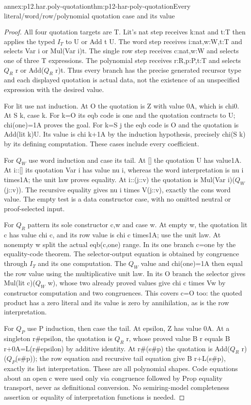 \begin{annexitem}{annex:p12.har.poly-quotation}{thm:p12-har-poly-quotation}{Every literal/word/row/polynomial quotation case and its value}
\begin{proof}
All four quotation targets are T. Lit's nat step receives k:nat and
t:T then applies the typed \(I_T\) to U or Add t U. The word step
receives i:nat,w:W,t:T and selects Var i or Mul(Var i)t. The
single row step receives c:nat,w:W and selects one of three T
expressions. The polynomial step receives r:R,p:P,t:T and selects
\(Q_R\) r or Add(\(Q_R\) r)t. Thus every branch has the precise generated
recursor type and each displayed quotation is actual data, not the
existence of an unspecified expression with the desired value.

For lit use nat induction. At O the quotation is Z with value 0A,
which is chi0. At S k, case k. For k=O its eqb code is one and
the quotation contracts to U; chi(one)=1A proves the goal. For
k=S j the eqb code is O and the quotation is Add(lit k)U. Its
value is chi k+1A by the induction hypothesis, precisely chi(S k)
by its defining computation. These cases include every coefficient.

For \(Q_W\) use word induction and case its tail. At [] the quotation
U has value1A. At i::[] its quotation Var i has value nu i, whereas
the word interpretation is nu i times1A; the unit law proves equality.
At i::(j::v) the quotation is Mul(Var i)(\(Q_W\)(j::v)). The recursive
equality gives nu i times V(j::v), exactly the cons word value.
The empty test is a data constructor case, with no omitted neutral
or proof-selected input.

For \(Q_R\) pattern its sole constructor c,w and case w. At empty w,
the quotation lit c has value chi c, and its row value is chi c
times1A; use the unit law. At nonempty w split the actual eqb(c,one)
range. In its one branch c=one by the equality-code theorem. The
selector-output equation is obtained by congruence through \(I_T\) and
its one computation. The \(Q_W\) value and chi(one)=1A then equal the
row value using the multiplicative unit law. In its O branch the
selector gives Mul(lit c)(\(Q_W\) w), whose two already proved values
give chi c times Vw by constructor computation and two congruences.
This covers c=O too: the quoted product has a zero literal and its
value is zero by annihilation, as is the row interpretation.

For \(Q_P\) use P induction, then case the tail. At epsilon, Z has value
0A. At a singleton r\#epsilon, the quotation is \(Q_R\) r, whose proved
value B r equals B r+0A=L(r\#epsilon) by additive identity. At r\#(s\#p)
the quotation is Add(\(Q_R\) r)(\(Q_P\)(s\#p)); the row equation and recursive
tail equation give B r+L(s\#p), exactly its list interpretation.
These are all polynomial shapes. Code equations about an open c were
used only via congruence followed by Prop equality transport, never
as definitional conversion. No semiring-model completeness assertion
or equality of interpretation functions is needed.
\end{proof}
\end{annexitem}

